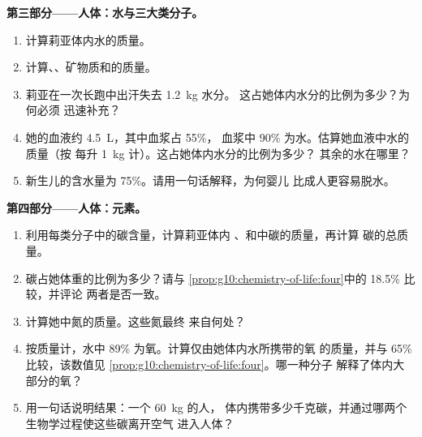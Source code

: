 \begin{problem}
\medskip
\noindent\textbf{第三部分——人体：水与三大类分子。}
\begin{enumerate}[resume]
  \item 计算莉亚体内水的质量。
  \item 计算、、矿物质和的质量。
  \item 莉亚在一次长跑中出汗失去 \qty{1.2}{kg} 水分。
        这占她体内水分的比例为多少？为何必须
        迅速补充？
  \item 她的血液约 \qty{4.5}{L}，其中血浆占 55\%，
        血浆中 90\% 为水。估算她血液中水的质量（按
        每升 \qty{1}{kg} 计）。这占她体内水分的比例为多少？
        其余的水在哪里？
  \item 新生儿的含水量为 75\%。请用一句话解释，为何婴儿
        比成人更容易脱水。
\end{enumerate}

\medskip
\noindent\textbf{第四部分——人体：元素。}
\begin{enumerate}[resume]
  \item 利用每类分子中的碳含量，计算莉亚体内
        、和中碳的质量，再计算
        碳的总质量。
  \item 碳占她体重的比例为多少？请与
        \cref{prop:g10:chemistry-of-life:four}中的 18.5\% 比较，并评论
        两者是否一致。
  \item 计算她中氮的质量。这些氮最终
        来自何处？
  \item 按质量计，水中 89\% 为氧。计算仅由她体内水所携带的氧
        的质量，并与 65\% 比较，该数值见
        \cref{prop:g10:chemistry-of-life:four}。哪一种分子
        解释了体内大部分的氧？
  \item 用一句话说明结果：一个 \qty{60}{kg} 的人，
        体内携带多少千克碳，并通过哪两个
        生物学过程使这些碳离开空气
        进入人体？
\end{enumerate}
\end{problem}
